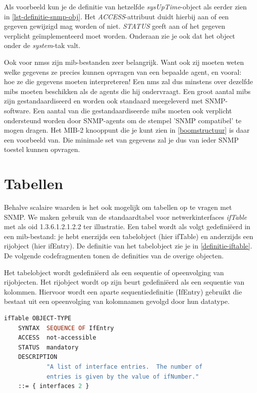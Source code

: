 Als voorbeeld kun je de definitie van hetzelfde \textit{sysUpTime}-object als eerder zien in \cref{lst-definitie-snmp-obj}.
Het \textit{ACCESS}-attribuut duidt hierbij aan of een gegeven gewijzigd mag worden of niet.
\textit{STATUS} geeft aan of het gegeven verplicht geïmplementeerd moet worden.
Onderaan zie je ook dat het object onder de \textit{system}-tak valt.

Ook voor \glspl{nms} zijn \gls{mib}-bestanden zeer belangrijk. Want ook zij moeten weten welke gegevens ze precies kunnen opvragen van een bepaalde
agent, en vooral: hoe ze die gegevens moeten interpreteren! Een \gls{nms} zal dus minstens  over dezelfde \glspl{mib} moeten beschikken als de
agents die hij ondervraagt. Een groot aantal \glspl{mib} zijn gestandaardiseerd en worden ook standaard meegeleverd met SNMP-software.
Een aantal van die gestandaardiseerde \glspl{mib} moeten ook verplicht ondersteund worden door SNMP-agents om de stempel 'SNMP compatibel' te mogen dragen.
Het MIB-2 knooppunt die je kunt zien in \cref{boomstructuur} is daar een voorbeeld van.
Die minimale set van gegevens zal je dus van ieder SNMP toestel kunnen opvragen.


\section{Tabellen}
\label{snmp-tabellen}

Behalve scalaire waarden is het ook mogelijk om tabellen op te vragen met SNMP.
We maken gebruik van de standaardtabel voor netwerkinterfaces \emph{ifTable} met als \gls{oid} 1.3.6.1.2.1.2.2 ter illustratie.
Een tabel wordt als volgt gedefiniëerd in een \gls{mib}-bestand: 
je hebt enerzijds een tabelobject (hier ifTable) en anderzijds een rijobject (hier ifEntry).
De definitie van het tabelobject zie je in \cref{definitie-iftable}.
De volgende codefragmenten tonen de definities van de overige objecten. %

Het tabelobject wordt gedefiniëerd als een sequentie of opeenvolging van rijobjecten.
Het rijobject wordt op zijn beurt gedefiniëerd als een sequentie van kolommen.
Hiervoor wordt een aparte sequentiedefinitie (IfEntry) gebruikt die 
bestaat uit een opeenvolging van kolomnamen gevolgd door hun datatype.

\begin{lstlisting}[language=asn.1, float=h, caption={Definitie van een tabel}, label=definitie-iftable]
ifTable OBJECT-TYPE
	SYNTAX	SEQUENCE OF IfEntry
	ACCESS	not-accessible
	STATUS	mandatory
	DESCRIPTION
			"A list of interface entries.  The number of
			entries is given by the value of ifNumber."
	::= { interfaces 2 }
\end{lstlisting}

